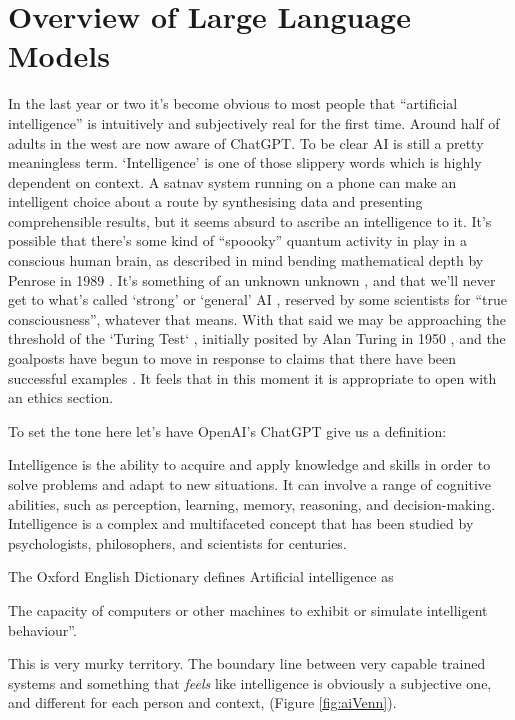 \section{Overview of Large Language Models}
In the last year or two it's become obvious to most people that ``artificial intelligence'' is intuitively and subjectively real for the first time. Around half of adults in the west are now aware of ChatGPT. To be clear AI is still a pretty meaningless term. `Intelligence' is one of those slippery words which is highly dependent on context. A satnav system running on a phone can make an intelligent choice about a route by synthesising data and presenting comprehensible results, but it seems absurd to ascribe an intelligence to it. It's possible that there's some kind of ``spoooky'' quantum activity in play in a conscious human brain, as described in mind bending mathematical depth by Penrose in 1989 \cite{penrose1990emperor}. It's something of an unknown unknown \cite{kerskens2022experimental}, and that we'll never get to what's called `strong' or `general' AI \cite{larson2021myth, searle1980minds}, reserved by some scientists for ``true consciousness'', whatever that means. With that said we may be approaching the threshold of the `Turing Test` \cite{sep-turing-test}, initially posited by Alan Turing in 1950 \cite{turing1950computing}, and the goalposts have begun to move in response to claims that there have been successful examples \cite{warwick2016can, french2012moving, french2000turing, searle2009turing}. It feels that in this moment it is appropriate to open with an ethics section.\par
To set the tone here let's have OpenAI's ChatGPT give us a definition:
\begin{tcolorbox}[enhanced, frame style={fill=lightgray}, interior style={fill=lightgray}]Intelligence is the ability to acquire and apply knowledge and skills in order to solve problems and adapt to new situations. It can involve a range of cognitive abilities, such as perception, learning, memory, reasoning, and decision-making. Intelligence is a complex and multifaceted concept that has been studied by psychologists, philosophers, and scientists for centuries.
\end{tcolorbox}
The Oxford English Dictionary defines Artificial intelligence as 
\begin{tcolorbox}[enhanced, frame style={fill=lightgray}, interior style={fill=lightgray}]The capacity of computers or other machines to exhibit or simulate intelligent behaviour''.
\end{tcolorbox} 
This is very murky territory. The boundary line between very capable trained systems and something that \textit{feels} like intelligence is obviously a subjective one, and different for each person and context, (Figure \ref{fig:aiVenn}).\par

